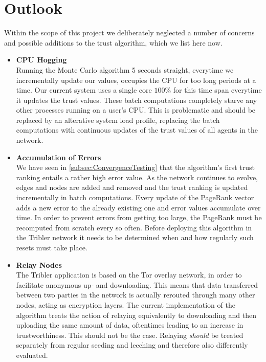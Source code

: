 \documentclass[sigconf]{acmart}
\theoremstyle{definition}
\begin{document}
\section{Outlook}
Within the scope of this project we deliberately neglected a number of concerns and possible additions to the trust algorithm, which we list here now.
\begin{itemize}
\item {\bf CPU Hogging} \\ Running the Monte Carlo algorithm 5 seconds straight, everytime we incrementally update our values, occupies the CPU for too long periods at a time. Our current system uses a single core $100\%$ for this time span everytime it updates the trust values. These batch computations completely starve any other processes running on a user's CPU. This is problematic and should be replaced by an alterative system load profile, replacing the batch computations with continuous updates of the trust values of all agents in the network. 

\item {\bf Accumulation of Errors} \\ We have seen in \ref{subsec:ConvergenceTesting} that the algorithm's first trust ranking entails a rather high error value. As the network continues to evolve, edges and nodes are added and removed and the trust ranking is updated incrementally in batch computations. Every update of the PageRank vector adds a new error to the already existing one and error values accumulate over time. In order to prevent errors from getting too large, the PageRank must be recomputed from scratch every so often. Before deploying this algorithm in the Tribler network it needs to be determined when and how regularly such resets must take place. 

\item {\bf Relay Nodes} \\ The Tribler application is based on the Tor overlay network, in order to facilitate anonymous up- and downloading. This means that data transferred between two parties in the network is actually rerouted through many other nodes, acting as encryption layers. The current implementation of the algorithm treats the action of relaying equivalently to downloading and then uploading the same amount of data, oftentimes leading to an increase in trustworthiness. This should not be the case. Relaying {\it should} be treated separately from regular seeding and leeching and therefore also differently evaluated. 
\end{itemize}
\end{document}
